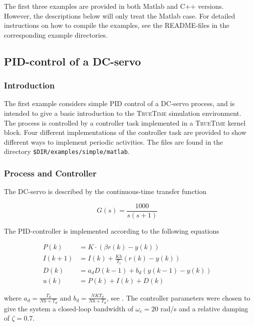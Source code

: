 \documentclass[final,twoside]{rapport}
\begin{document}
The first three examples are provided in both Matlab and C++ versions.
However, the descriptions below will only treat the Matlab case. For
detailed instructions on how to compile the examples, see the
README-files in the corresponding example directories.

\subsection{PID-control of a DC-servo}
\label{sec:pid}

\subsubsection{Introduction}
The first example considers simple PID control of a DC-servo
process, and is intended to give a basic introduction to the
\textsc{TrueTime} simulation environment. The process is controlled by
a controller task implemented in a \textsc{TrueTime} kernel block.
Four different implementations of the controller task are provided to
show different ways to implement periodic activities. The files are
found in the directory \texttt{\$DIR/examples/simple/matlab}.

\subsubsection{Process and Controller}
The DC-servo is described by the continuous-time transfer function

\begin{equation}
\label{eq:servo}
G(s) = \frac{1000}{s(s+1)} 
\end{equation}

The PID-controller is implemented according to the following equations

\begin{equation}
  \begin{aligned}
    P(k) & =  K \cdot (\beta r(k) - y(k)) \\
    I(k+1) & = I(k) + \frac{Kh}{T_i}(r(k) - y(k)) \\
    D(k) & = a_d D(k-1) + b_d (y(k-1) - y(k)) \\
    u(k) & = P(k) + I(k) + D(k)
  \end{aligned}
  \label{eq:ctrl}
\end{equation}

where $a_d = \frac{T_d}{Nh+T_d}$ and $b_d = \frac{NKT_d}{Nh+T_d}$, see
\cite{ast+hagg95}. The controller parameters were chosen to give the
system a closed-loop bandwidth of $\omega_c = 20$ rad/s and a relative
damping of $\zeta = 0.7$.
\end{document}
